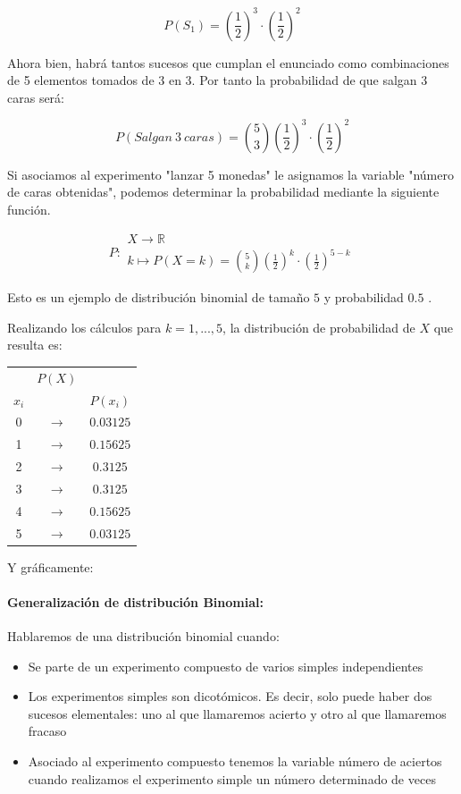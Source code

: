 $$P\left(S_1\right)=\left(\frac{1}{2}\right)^3\cdot  \left(\frac{1}{2}\right)^2$$

Ahora bien, habrá tantos sucesos que cumplan el enunciado como combinaciones de 5 elementos tomados de 3 en 3. Por tanto la probabilidad de que salgan 3 caras será:

$$P\left(Salgan \ 3 \ caras\right)=\binom{5}{3}\left(\frac{1}{2}\right)^3\cdot  \left(\frac{1}{2}\right)^2$$

Si asociamos al experimento "lanzar 5 monedas" le asignamos la variable "número de caras obtenidas", podemos determinar la probabilidad mediante la siguiente función.

$$P\colon \begin{array}{l} 
          X \rightarrow \mathbb{R} \\ 
          k\mapsto P(X=k)=\binom{5}{k}\left(\frac{1}{2}\right)^k\cdot  \left(\frac{1}{2}\right)^{5-k} 
         \end{array}$$

Esto es un ejemplo de distribución binomial de tamaño $5$ y probabilidad $0.5$ .

Realizando los cálculos para $k = 1,...,5 $, la distribución de probabilidad de $X$ que resulta es:

\begin{center}
\begin{tabular}{ccc}
 & $P(X)$ &  \\
$x_i$ &  &  $P(x_i)$\\ \hline 
0 & $\rightarrow$ & $0.03125$ \\ 
1 & $\rightarrow$ & $0.15625$ \\ 
2 & $\rightarrow$ & $0.3125$ \\ 
3 & $\rightarrow$ & $0.3125$ \\ 
4 & $\rightarrow$ & $0.15625$ \\ 
5 & $\rightarrow$ & $0.03125$ \\ 
\end{tabular} 
\end{center}

Y gráficamente: 




\paragraph{Generalización de distribución Binomial:} Hablaremos de una distribución binomial cuando:
\begin{itemize}
\item Se parte de un experimento compuesto de varios simples independientes
\item Los experimentos simples son dicotómicos. Es decir, solo puede haber dos sucesos elementales: uno al que llamaremos acierto y otro al que llamaremos fracaso
\item Asociado al experimento compuesto tenemos la variable número de aciertos cuando realizamos el experimento simple un número determinado de veces
\end{itemize}

